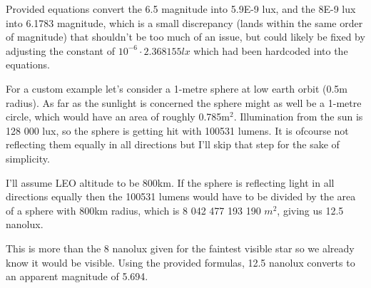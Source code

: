 \documentclass[a4paper]{article}
\begin{document}
	\medskip
	
	Provided equations convert the 6.5 magnitude into 5.9E-9 lux, and the 8E-9 lux into 6.1783 magnitude, which is a small discrepancy (lands within the same order of magnitude) that shouldn't be too much of an issue, but could likely be fixed by adjusting the constant of $10^{-6} \cdot 2.368155lx$ which had been hardcoded into the equations.
	
	\bigskip
	
	For a custom example let's consider a 1-metre sphere at low earth orbit (0.5m radius).
	As far as the sunlight is concerned the sphere might as well be a 1-metre circle, which would have an area of roughly 0.785m$^2$.
	Illumination from the sun is 128 000 lux, so the sphere is getting hit with 100531 lumens.
	It is ofcourse not reflecting them equally in all directions but I'll skip that step for the sake of simplicity.
	
	\medskip
	
	I'll assume LEO altitude to be 800km. If the sphere is reflecting light in all directions equally then the 100531 lumens would have to be divided by the area of a sphere with 800km radius, which is 8 042 477 193 190 $m^2$, giving us 12.5 nanolux.
	
	\medskip
	
	This is more than the 8 nanolux given for the faintest visible star so we already know it would be visible. Using the provided formulas, 12.5 nanolux converts to an apparent magnitude of 5.694.
	
\end{document}
